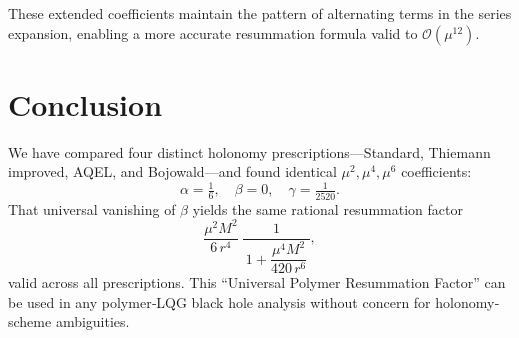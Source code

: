 \documentclass[11pt]{article}
\begin{document}
These extended coefficients maintain the pattern of alternating terms in the series expansion, enabling a more accurate resummation formula valid to $\mathcal{O}(\mu^{12})$.

\section{Conclusion}

We have compared four distinct holonomy prescriptions—Standard, Thiemann improved, AQEL, and Bojowald—and found identical $\mu^2,\mu^4,\mu^6$ coefficients:
\[
\alpha= \tfrac{1}{6},\quad \beta=0,\quad \gamma= \tfrac{1}{2520}.
\]
That universal vanishing of $\beta$ yields the same rational resummation factor
\[
\frac{\mu^{2}M^{2}}{6\,r^{4}}\;\frac{1}{\,1 + \dfrac{\mu^{4}M^{2}}{420\,r^{6}}\,},
\]
valid across all prescriptions.  This “Universal Polymer Resummation Factor” can be used in any polymer‐LQG black hole analysis without concern for holonomy‐scheme ambiguities.
\end{document}
